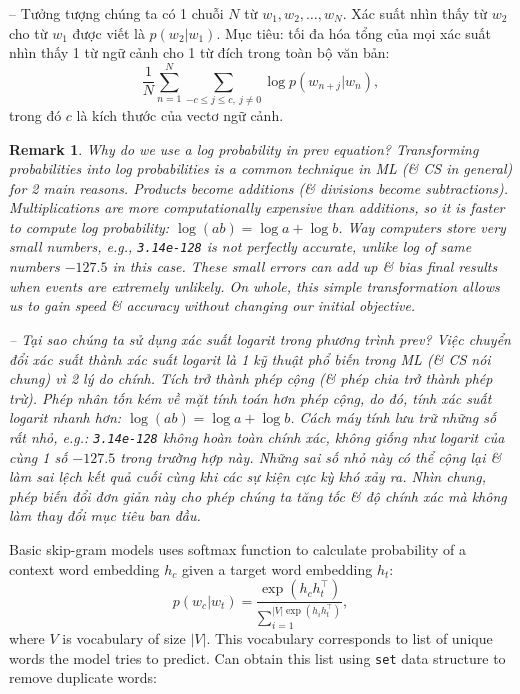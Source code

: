 \documentclass{article}
\newtheorem{remark}{Remark}
\begin{document}
\begin{itemize}
\begin{itemize}
\begin{itemize}
            -- Tưởng tượng chúng ta có 1 chuỗi $N$ từ $w_1,w_2,\ldots,w_N$. Xác suất nhìn thấy từ $w_2$ cho từ $w_1$ được viết là $p(w_2|w_1)$. Mục tiêu: tối đa hóa tổng của mọi xác suất nhìn thấy 1 từ ngữ cảnh cho 1 từ đích trong toàn bộ văn bản:
            \begin{equation*}
                \frac{1}{N}\sum_{n=1}^N\sum_{-c\le j\le c,\ j\ne0} \log p(w_{n+j}|w_n),
            \end{equation*}
            trong đó $c$ là kích thước của vectơ ngữ cảnh.

            \begin{remark}
                Why do we use a log probability in prev equation? Transforming probabilities into log probabilities is a common technique in ML (\& CS in general) for 2 main reasons. Products become additions (\& divisions become subtractions). Multiplications are more computationally expensive than additions, so it is faster to compute log probability: $\log(ab) = \log a + \log b$. Way computers store very small numbers, e.g., {\tt3.14e-128} is not perfectly accurate, unlike log of same numbers $-127.5$ in this case. These small errors can add up \& bias final results when events are extremely unlikely. On whole, this simple transformation allows us to gain speed \& accuracy without changing our initial objective.

                -- Tại sao chúng ta sử dụng xác suất logarit trong phương trình prev? Việc chuyển đổi xác suất thành xác suất logarit là 1 kỹ thuật phổ biến trong ML (\& CS nói chung) vì 2 lý do chính. Tích trở thành phép cộng (\& phép chia trở thành phép trừ). Phép nhân tốn kém về mặt tính toán hơn phép cộng, do đó, tính xác suất logarit nhanh hơn: $\log(ab) = \log a + \log b$. Cách máy tính lưu trữ những số rất nhỏ, e.g.: {\tt3.14e-128} không hoàn toàn chính xác, không giống như logarit của cùng 1 số $-127.5$ trong trường hợp này. Những sai số nhỏ này có thể cộng lại \& làm sai lệch kết quả cuối cùng khi các sự kiện cực kỳ khó xảy ra. Nhìn chung, phép biến đổi đơn giản này cho phép chúng ta tăng tốc \& độ chính xác mà không làm thay đổi mục tiêu ban đầu.
            \end{remark}
            Basic skip-gram models uses softmax function to calculate probability of a context word embedding $h_c$ given a target word embedding $h_t$:
            \begin{equation*}
                p(w_c|w_t) = \frac{\exp(h_ch_t^\top)}{\sum_{i=1}^{|V| \exp(h_ih_t^\top)}},
            \end{equation*}
            where $V$ is vocabulary of size $|V|$. This vocabulary corresponds to list of unique words the model tries to predict. Can obtain this list using {\tt set} data structure to remove duplicate words:


\end{itemize}
\end{itemize}
\end{itemize}
\end{document}
